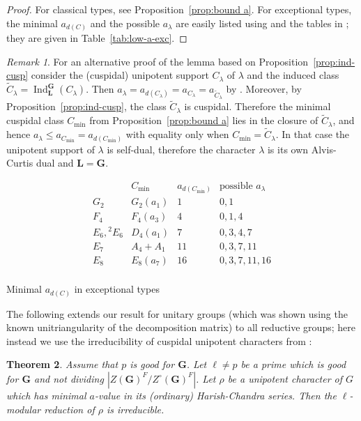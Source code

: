 \documentclass[12pt,leqno,a4paper]{amsart}
\newcommand{\bG}{{\mathbf{G}}}
\newcommand{\bL}{{\mathbf{L}}}
\newcommand{\Ind}{{\operatorname{Ind}}}
\newcommand{\mi}{{\operatorname{min}}}
\newcommand{\tw}[1]{{}^{#1}\!}
\let\la=\lambda
\newtheorem{thm}{Theorem}[section]
\theoremstyle{remark}
\newtheorem{rem}[thm]{Remark}
\begin{document}
\begin{proof}
For classical types, see Proposition~\ref{prop:bound a}. For exceptional types,
the minimal $a_{d(C)}$ and the possible $a_\la$ are easily listed using
\cite[Prop.~3.6]{GM96} and the tables in \cite[\S13]{Ca};
they are given in Table~\ref{tab:low-a-exc}.
\end{proof}

\begin{rem}
For an alternative proof of the lemma based on Proposition~\ref{prop:ind-cusp}
consider the (cuspidal) unipotent support $C_\la$ of $\la$ and the induced
class $\widetilde C_\la = \Ind_\bL^\bG(C_\la)$. Then
$a_\la=a_{d(C_\la)}=a_{C_\la}=a_{\widetilde C_\la}$ by
\cite[Thm.~1.3]{LuSp}.
Moreover, by Proposition~\ref{prop:ind-cusp}, the class $\widetilde C_\la$
is cuspidal. Therefore the minimal cuspidal class $C_\mi$ from
Proposition~\ref{prop:bound a} lies in the closure of $\widetilde C_\la$,
and hence $a_{\la} \leq a_{C_\mi} = a_{d(C_\mi)}$ with equality only when
$C_\mi = \widetilde C_\la$. In that case the unipotent support of $\la$
is self-dual, therefore the character $\la$ is its own Alvis-Curtis dual
and $\bL = \bG$.
\end{rem}

\begin{table}[htbp]
\[\begin{array}{c|cccccccccl}
  & C_\mi& a_{d(C_\mi)}& \text{possible } a_\la\\
\hline
 G_2& G_2(a_1)& 1& 0,1\\
 F_4& F_4(a_3)& 4& 0, 1, 4\\
 E_6,\tw2E_6& D_4(a_1)& 7& 0,3,4,7\\
 E_7& A_4+A_1& 11& 0,3,7,11\\
 E_8& E_8(a_7)& 16& 0,3,7,11,16\\
\end{array}\]
 \caption{Minimal $a_{d(C)}$ in exceptional types}  \label{tab:low-a-exc}
\end{table}

The following extends our result \cite[Prop.~4.3]{DM15} for unitary groups
(which was shown using the known unitriangularity of the decomposition
matrix) to all reductive groups; here instead we use the irreducibility of
cuspidal unipotent characters from \cite[Thm.~A]{DM17}:

\begin{thm}   \label{thm:HC-irr}
 Assume that $p$ is good for $\bG$. Let $\ell\ne p$ be a prime which is good
 for $\bG$ and not dividing $|Z(\bG)^F/Z^\circ(\bG)^F|$. Let $\rho$ be a
 unipotent character of $G$ which has minimal $a$-value in its (ordinary)
 Harish-Chandra series. Then the $\ell$-modular reduction of $\rho$ is
 irreducible.
\end{thm}
\end{document}
